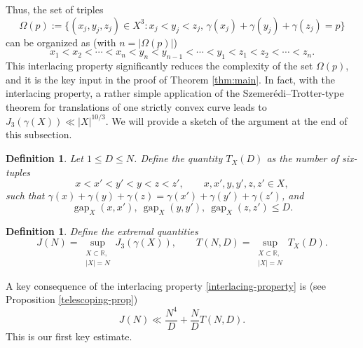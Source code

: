 \documentclass{amsart}
\numberwithin{equation}{section}
\newtheorem{definition}[theorem]{Definition}
\newcommand{\R}{\mathbb{R}}
\begin{document}
Thus, the set of triples 
\begin{equation}
    \nonumber
    \Omega(p):=\{(x_j,y_j,z_j)\in X^3:x_j<y_j<z_j,\, \gamma(x_j)+\gamma(y_j)+\gamma(z_j)=p\}
\end{equation}
can be organized as (with $n=|\Omega(p)|$)
\begin{equation}
    \label{interlacing-property}
    x_1<x_2<\cdots<x_n<y_n<y_{n-1}<\cdots<y_1<z_1<z_2<\cdots<z_n.
\end{equation}
This interlacing property significantly reduces the complexity of the set $\Omega(p)$, and it is the key input in the proof of Theorem \ref{thm:main}.
In fact, with the interlacing property, a rather simple application of the Szemer\'edi--Trotter-type theorem for translations of one strictly convex curve leads to $J_3(\gamma(X))\ll |X|^{10/3}$. 
We will provide a sketch of the argument at the end of this subsection.

\begin{definition}
    \label{Th}
    Let $1\leq D\leq N$.
    Define the quantity $T_X(D)$ as the number of six-tuples
    \begin{equation}
        \label{condition-1}
        x < x' < y' < y < z < z',
        \qquad
        x,x',y,y',z,z' \in X,
    \end{equation}
    such that $ \gamma(x)+\gamma(y)+\gamma(z)=\gamma(x')+\gamma(y')+\gamma(z')$, and
    \begin{equation}
    \nonumber
        \operatorname{gap}_X(x,x'),\
        \operatorname{gap}_X(y,y'), \
        \operatorname{gap}_X(z,z') \leq D.
    \end{equation}
\end{definition}

\begin{definition}
    \label{extremal-def}
    Define the extremal quantities
    \begin{equation}
        \nonumber 
        J(N)=\sup_{\substack{X\subset \R,\\ |X|=N}}J_3(\gamma(X)),
        \qquad
        T(N,D)=\sup_{\substack{X\subset \R,\\ |X|=N}}T_X(D).
    \end{equation}
\end{definition}

\medskip 

A key consequence of the interlacing property \eqref{interlacing-property} is (see Proposition \ref{telescoping-prop})
\begin{equation}
\label{telescoping-intro}
    J(N)\ll \frac{N^4}{D} + \frac{N}{D}T(N,D).
\end{equation}
This is our first key estimate.
\end{document}
